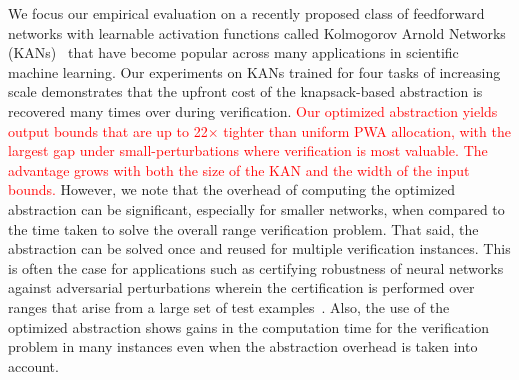 We focus our empirical evaluation on a recently proposed class of feedforward networks with learnable activation functions called Kolmogorov Arnold Networks (KANs)~\cite{li2024kolmogorovarnold,Liu+Others/2025/KAN} that have become popular across many applications in scientific machine learning. Our experiments on KANs trained for four tasks of increasing scale demonstrates that the upfront cost of the knapsack-based abstraction is recovered many times over during verification. \textcolor{red}{Our optimized abstraction yields output bounds that are up to 22$\times$ tighter than uniform PWA allocation, with the largest gap under small-perturbations where verification is most valuable. The advantage grows with both the size of the KAN and the width of the input bounds.} However, we  note that the overhead of computing the optimized abstraction can be  significant, especially for smaller networks, when compared to the time taken to solve the overall range verification problem. That said, the abstraction can be solved once and reused for multiple verification instances. This is often the case for applications such as certifying robustness of neural networks against adversarial perturbations wherein the certification is performed over ranges that arise from a large set of test examples~\cite{SinghEtAl2019AbstractDomain}.
Also, the use of the optimized abstraction shows gains in the computation time for the verification problem in many instances even when the abstraction overhead is taken into account. 





